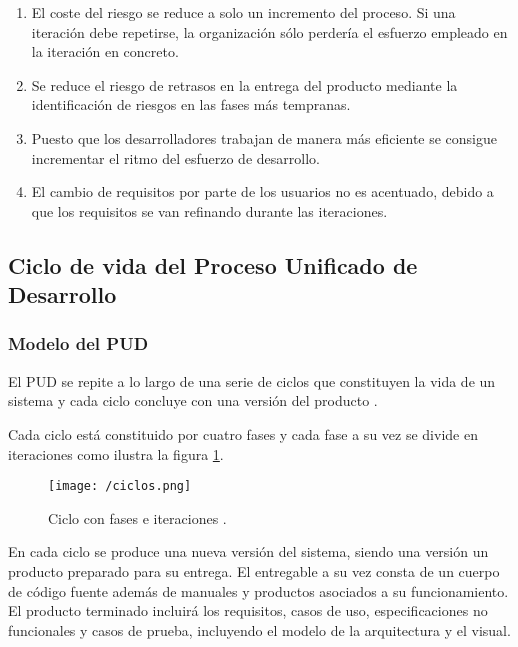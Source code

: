 \begin{enumerate}
\item El coste del riesgo se reduce a solo un incremento del proceso. Si una
  iteración debe repetirse, la organización sólo perdería el esfuerzo empleado
  en la iteración en concreto. 
\item Se reduce el riesgo de retrasos en la entrega del producto mediante la
  identificación de riesgos en las fases más tempranas. 
\item Puesto que los desarrolladores trabajan de manera más eficiente se
  consigue incrementar el ritmo del esfuerzo de desarrollo. 
\item El cambio de requisitos por parte de los usuarios no es acentuado, debido
  a que los requisitos se van refinando durante las iteraciones. 
\end{enumerate}


\subsection{Ciclo de vida del Proceso Unificado de Desarrollo}

\subsubsection{Modelo del \acs{PUD}}

El \acs{PUD} se repite a lo largo de una serie de ciclos que constituyen la vida
de un sistema y cada ciclo concluye con una versión del producto
\cite{rumbaugh_jacobson_pud}. 

Cada ciclo está constituido por cuatro fases y cada fase a su vez se divide en
iteraciones como ilustra la figura \ref{fig:ciclos-pud}.  


\begin{figure}[!h]
  \begin{center}
    \texttt{[image: /ciclos.png]} 
    \caption{Ciclo con fases e iteraciones \cite{rumbaugh_jacobson_pud}.}
    \label{fig:ciclos-pud}
  \end{center}
\end{figure}


En cada ciclo se produce una nueva versión del sistema, siendo una versión un
producto preparado para su entrega. El entregable a su vez consta de un cuerpo
de código fuente además de manuales y productos asociados a su
funcionamiento. El producto terminado incluirá los requisitos, casos de uso,
especificaciones no funcionales y casos de prueba, incluyendo el modelo de la
arquitectura y el visual. 


